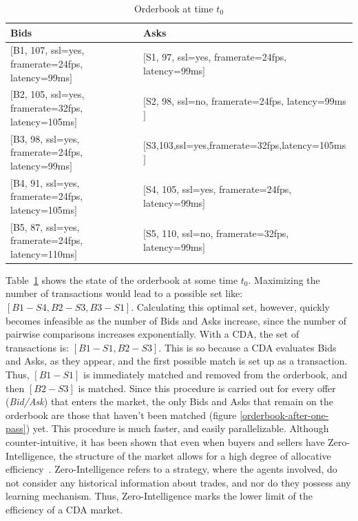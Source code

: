 \documentclass[10pt,journal,compsoc]{IEEEtran}
\begin{document}
\begin{table}
\centering
\begin{tabular}{ll}
\toprule
Bids & Asks \\
\midrule
$[$\small{B1, 107, ssl=yes, framerate=24fps, latency=99ms}$]$ & $[$\small{S1, 97, ssl=yes, framerate=24fps, latency=99ms}$]$ \\
$[$\small{B2, 105, ssl=yes, framerate=32fps, latency=105ms}$]$ & $[$\small{S2, 98, ssl=no, framerate=24fps, latency=99ms}$]$ \\
$[$\small{B3, 98, ssl=yes, framerate=24fps, latency=99ms}$]$ & $[$\small{S3,103,ssl=yes,framerate=32fps,latency=105ms}$]$ \\
$[$\small{B4, 91, ssl=yes, framerate=24fps, latency=105ms}$]$ & $[$\small{S4, 105, ssl=yes, framerate=24fps, latency=99ms}$]$ \\
$[$\small{B5, 87, ssl=yes, framerate=24fps, latency=110ms}$]$ & $[$\small{S5, 110, ssl=no, framerate=32fps, latency=99ms}$]$ \\
\bottomrule
\end{tabular}
\caption{Orderbook at time $t_{0}$ \label{orderbook}}
\end{table}
Table~\ref{orderbook} shows the state of the orderbook at some time \textit{$t_{0}$}. Maximizing the number of transactions would lead to a possible set like: $[B1-S4, B2-S3, B3-S1]$. Calculating this optimal set, however, quickly becomes infeasible as the number of Bids and Asks increase, since the number of pairwise comparisons increases exponentially.  With a CDA, the set of transactions is: $[B1-S1, B2-S3]$. This is so because a CDA evaluates Bids and Asks, as they appear, and the first possible match is set up as a transaction. Thus, $[B1-S1]$ is immediately matched and removed from the orderbook, and then $[B2-S3]$ is matched.  Since this procedure is carried out for every offer (\textit{Bid/Ask}) that enters the market, the only Bids and Asks that remain on the orderbook are those that haven't been matched (figure \ref{orderbook-after-one-pass}) yet. This procedure is much faster, and easily parallelizable. Although counter-intuitive, it has been shown that even when buyers and sellers have Zero-Intelligence, the structure of the market allows for a high degree of allocative efficiency~\cite{Gode1993Allocative}. Zero-Intelligence refers to a strategy, where the agents involved, do not consider any historical information about trades, and nor do they possess any learning mechanism. Thus, Zero-Intelligence marks the lower limit of the efficiency of a CDA market.
\end{document}
